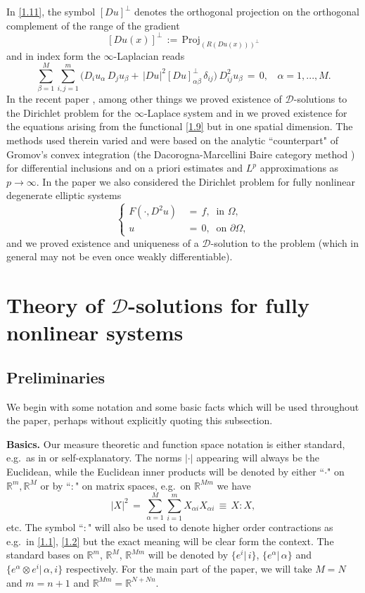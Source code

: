 \documentclass{amsart}
\theoremstyle{definition}
\numberwithin{equation}{section}
\begin{document}
In \eqref{1.11}, the symbol $[Du]^\bot$ denotes the orthogonal projection on the orthogonal complement of the range of the gradient
\[
[Du(x)]^\bot\,:=\, \text{Proj}_{(R(Du(x)))^\bot}
\]
and in index form the $\infty$-Laplacian reads
\[
\sum_{{\beta}=1}^M\sum_{i,j=1}^m \Big(D_iu_{\alpha} \, D_ju_{\beta} +\, |Du|^2 [Du]_{{\alpha} {\beta}}^\bot \, {\delta}_{ij}\Big)\, D_{ij}^2u_{\beta}\, =\, 0, \ \ \ \ {\alpha}=1,...,M.
\]
In the recent paper \cite{K8}, among other things we proved existence of ${\mathcal{D}}$-solutions to the Dirichlet problem for the $\infty$-Laplace system and in \cite{K9} we proved existence for the equations arising from the functional \eqref{1.9} but in one spatial dimension.
The methods used therein varied and were based on the analytic ``counterpart" of Gromov's convex integration (the Dacorogna-Marcellini Baire category method \cite{DM}) for differential inclusions and on a priori estimates and $L^p$ approximations as $p{\rightarrow} \infty$. In the paper \cite{K8} we also considered the Dirichlet problem for fully nonlinear degenerate elliptic systems
\[
\left\{
\begin{split}
F(\cdot,D^2u) \, & =\, f, \ \text{ in }{\Omega},\\
u\, &=\, 0, \ \text{ on }{\partial}{\Omega},
 \end{split}
 \right.
\]
and we proved existence and uniqueness  of a ${\mathcal{D}}$-solution to the problem (which in general may not be even once weakly differentiable).
 

\section{Theory of ${\mathcal{D}}$-solutions for fully nonlinear systems} \label{section2}

\subsection{Preliminaries}  \label{subsection2.1} We begin with some notation and some basic facts which will be used throughout the paper, perhaps without explicitly quoting this subsection. 
{\medskip}

{\noindent} \textbf{Basics.} Our measure theoretic and function space notation is either standard, e.g.\ as in \cite{E2,EG} or self-explanatory. The norms $|\cdot|$ appearing will always be the Euclidean, while the Euclidean inner products will be denoted by either ``$\cdot$" on ${\mathbb{R}}^m,{\mathbb{R}}^M$ or by ``$:$" on matrix spaces, e.g.\ on ${\mathbb{R}}^{Mm}$ we have 
\[
|X|^2\, = \,\sum_{{\alpha}=1}^M\sum_{i=1}^m X_{{\alpha} i}X_{{\alpha} i} \, \equiv\, X{\!:\!} X ,
\]
etc. The symbol ``$:$" will also be used to denote higher order contractions as e.g.\ in \eqref{1.1}, \eqref{1.2} but the exact meaning will be clear form the context. The standard bases on ${\mathbb{R}}^m$, ${\mathbb{R}}^M$, ${\mathbb{R}}^{Mm}$ will be denoted by $\{e^i | \, i\}$, $\{e^{\alpha} | \, {\alpha}\}$ and $\{ e^{\alpha} {\otimes} e^i |\, {\alpha},i\}$ respectively. For the main part of the paper, we will take $M=N$ and $m=n+1$ and ${\mathbb{R}}^{Mm}={\mathbb{R}}^{N+Nn}$. 
\end{document}
